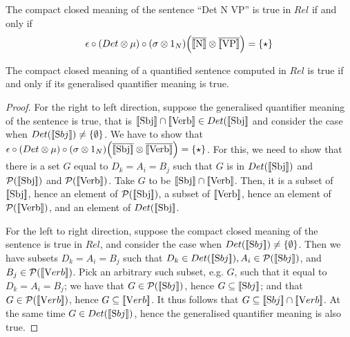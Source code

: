 \begin{definition}
\label{deftrue}
The compact closed meaning of the sentence ``Det N VP'' is true  in $Rel$ if and only if 
\[
\epsilon \circ (Det \otimes \mu) \circ (\sigma \otimes 1_N) \Big(\overline{[\![ \text{N} ]\!]} \otimes \overline{[\![ \text{VP} ]\!]} \Big) = \{\star\} 
\] 
\end{definition}


\begin{proposition}
The  compact closed meaning of a quantified sentence computed in $Rel$ is true if and only if  its generalised quantifier meaning is true.
\end{proposition}

\begin{proof}
For the right to left direction,  suppose  the generalised quantifier meaning of the sentence is true, that is $[\![ \text{Sbj} ]\!] \cap [\![ \text{Verb} ]\!] \in Det([\![ \text{Sbj} ]\!]$ and consider the case when  $Det([\![ \text Sbj ]\!]) \neq \{\emptyset\}$. We have to show that $\epsilon \circ (Det \otimes \mu) \circ (\sigma \otimes 1_N) \Big(\overline{[\![ \text{Sbj} ]\!]} \otimes \overline{[\![ \text{Verb} ]\!]} \Big) = \{\star\}$.  For this, we need to show that there is a set $G$ equal to $D_k= A_i = B_j$ such that $G$ is in $Det([\![ \text{Sbj} ]\!])$ and $ {\cal P} ([\![ \text{Sbj} ]\!])$ and  ${\cal P} ([\![ \text{Verb} ]\!])$.  Take $G$ to be $[\![ \text{Sbj} ]\!] \cap [\![ \text{Verb} ]\!]$.  Then, it is a subset of   $[\![ \text{Sbj} ]\!]$, hence an element of  $ {\cal P} ([\![ \text{Sbj} ]\!])$, a subset of  $ [\![ \text{Verb} ]\!]$, hence an element of $ {\cal P} ([\![ \text{Verb} ]\!])$, and an element of $Det([\![ \text{Sbj} ]\!]$. 


For the left to right direction, suppose the compact closed meaning of the sentence is true in $Rel$, and consider  the case when $Det([\![ \text Sbj ]\!]) \neq \{\emptyset\}$. Then  we have  subsets $D_k = A_i = B_j$ such that $D_k \in Det([\![ \text Sbj ]\!]), A_i \in {\cal P}([\![ \text Sbj ]\!])$, and $B_j \in {\cal P}([\![ \text Verb ]\!])$.  Pick an arbitrary such subset, e.g.  $G$, such that it   equal to  $D_k = A_i = B_j$; we have that $G \in   {\cal P}([\![ \text Sbj ]\!])$, hence $G \subseteq [\![ \text Sbj ]\!]$; and that $G \in  {\cal P}([\![ \text Verb ]\!])$, hence $G \subseteq [\![ \text Verb ]\!]$. It thus follows that $G \subseteq [\![ \text Sbj ]\!]  \cap [\![ \text Verb ]\!]$. At the same time $G \in Det([\![ \text Sbj ]\!])$, hence the generalised quantifier meaning is also true.  


\end{proof}
